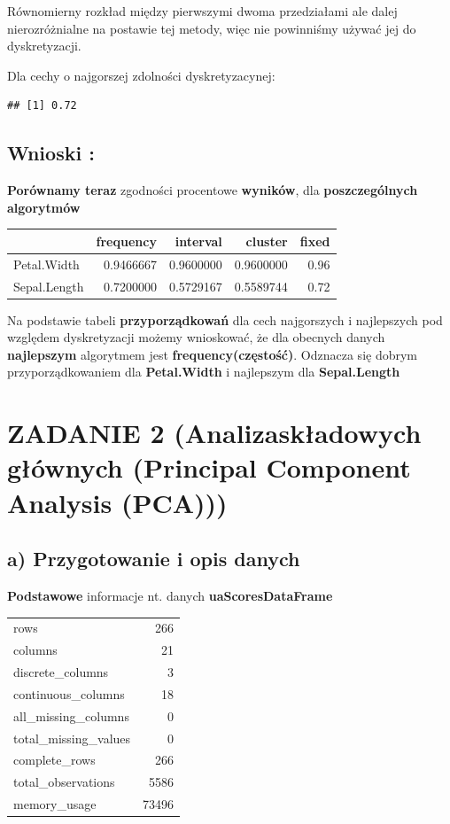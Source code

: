 \documentclass[
  12pt,
]{article}
\begin{document}
Równomierny rozkład między pierwszymi dwoma przedziałami ale dalej
nierozróżnialne na postawie tej metody, więc nie powinniśmy używać jej
do dyskretyzacji.

Dla cechy o najgorszej zdolności dyskretyzacynej:

\begin{verbatim}
## [1] 0.72
\end{verbatim}

\subsection{Wnioski :}\label{wnioski}

\textbf{Porównamy teraz} zgodności procentowe \textbf{wyników}, dla
\textbf{poszczególnych algorytmów}

\begin{longtable}[]{@{}lrrrr@{}}
\toprule\noalign{}
& frequency & interval & cluster & fixed \\
\midrule\noalign{}
\endhead
\bottomrule\noalign{}
\endlastfoot
Petal.Width & 0.9466667 & 0.9600000 & 0.9600000 & 0.96 \\
Sepal.Length & 0.7200000 & 0.5729167 & 0.5589744 & 0.72 \\
\end{longtable}

Na podstawie tabeli \textbf{przyporządkowań} dla cech najgorszych i
najlepszych pod względem dyskretyzacji możemy wnioskować, że dla
obecnych danych \textbf{najlepszym} algorytmem jest
\textbf{frequency(częstość)}. Odznacza się dobrym przyporządkowaniem dla
\textbf{Petal.Width} i najlepszym dla \textbf{Sepal.Length}

\section{ZADANIE 2 (Analizaskładowych głównych (Principal Component
Analysis
(PCA)))}\label{zadanie-2-analizaskux142adowych-gux142uxf3wnych-principal-component-analysis-pca}

\subsection{a) Przygotowanie i opis
danych}\label{a-przygotowanie-i-opis-danych}

\textbf{Podstawowe} informacje nt. danych \textbf{uaScoresDataFrame}

\begin{longtable}[]{@{}lr@{}}
\toprule\noalign{}
\endhead
\bottomrule\noalign{}
\endlastfoot
rows & 266 \\
columns & 21 \\
discrete\_columns & 3 \\
continuous\_columns & 18 \\
all\_missing\_columns & 0 \\
total\_missing\_values & 0 \\
complete\_rows & 266 \\
total\_observations & 5586 \\
memory\_usage & 73496 \\
\end{longtable}
\end{document}
